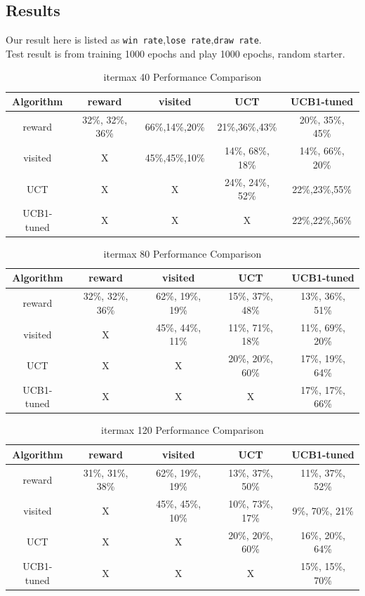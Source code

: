\documentclass[11pt]{article}
\theoremstyle{definitionstyle}
\begin{document}
\subsection{Results}
Our result here is listed as \texttt{win rate},\texttt{lose rate},\texttt{draw rate}.\\
Test result is from training 1000 epochs and play 1000 epochs, random starter.\\
\begin{table}[H]
\centering
\begin{tabular}{|c|c|c|c|c|}
\hline
Algorithm & reward & visited & UCT & UCB1-tuned \\ \hline
reward & 32\%, 32\%, 36\% & 66\%,14\%,20\% & 21\%,36\%,43\% & 20\%, 35\%, 45\% \\ \hline
visited & X & 45\%,45\%,10\% & 14\%, 68\%, 18\% & 14\%, 66\%, 20\% \\ \hline
UCT & X & X & 24\%, 24\%, 52\% & 22\%,23\%,55\% \\ \hline
UCB1-tuned & X & X & X & 22\%,22\%,56\% \\ \hline
\end{tabular}
\caption{itermax 40 Performance Comparison}
\label{40}
\end{table}
\begin{table}[H]
\centering
\begin{tabular}{|c|c|c|c|c|}
\hline
Algorithm & reward & visited & UCT & UCB1-tuned \\ \hline
reward & 32\%, 32\%, 36\% & 62\%, 19\%, 19\% & 15\%, 37\%, 48\% & 13\%, 36\%, 51\% \\ \hline
visited & X & 45\%, 44\%, 11\% & 11\%, 71\%, 18\% & 11\%, 69\%, 20\% \\ \hline
UCT & X & X & 20\%, 20\%, 60\% & 17\%, 19\%, 64\% \\ \hline
UCB1-tuned & X & X & X & 17\%, 17\%, 66\% \\ \hline
\end{tabular}
\caption{itermax 80 Performance Comparison}
\label{80}
\end{table}
\begin{table}[H]
\centering
\begin{tabular}{|c|c|c|c|c|}
\hline
Algorithm & reward & visited & UCT & UCB1-tuned \\ \hline
reward & 31\%, 31\%, 38\% & 62\%, 19\%, 19\% & 13\%, 37\%, 50\% & 11\%, 37\%, 52\% \\ \hline
visited & X & 45\%, 45\%, 10\% & 10\%, 73\%, 17\% & 9\%, 70\%, 21\% \\ \hline
UCT & X & X & 20\%, 20\%, 60\% & 16\%, 20\%, 64\% \\ \hline
UCB1-tuned & X & X & X & 15\%, 15\%, 70\% \\ \hline
\end{tabular}
\caption{itermax 120 Performance Comparison}
\label{120}
\end{table}
\end{document}
